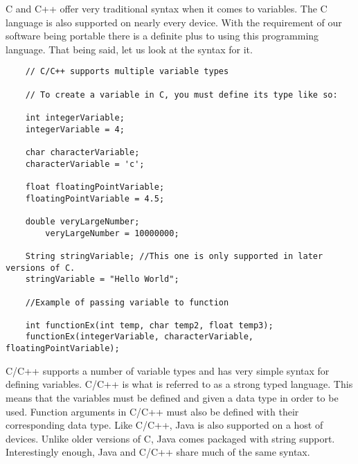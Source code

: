 \documentclass[journal,10pt,onecolumn,compsoc]{IEEEtran} \usepackage[margin=1.0in]{geometry} \usepackage{pdfpages} \usepackage{graphicx}
\begin{document}
\noindent C and C++ offer very traditional syntax when it comes to variables. 
The C language is also supported on nearly every device. 
With the requirement of our software being portable there is a definite plus to using this programming language. 
That being said, let us look at the syntax for it.

\begin{verbatim}
	// C/C++ supports multiple variable types

	// To create a variable in C, you must define its type like so:

	int integerVariable;
	integerVariable = 4;

	char characterVariable;
	characterVariable = 'c';
    
	float floatingPointVariable;
	floatingPointVariable = 4.5;

	double veryLargeNumber;
    	veryLargeNumber = 10000000;

	String stringVariable; //This one is only supported in later versions of C.
	stringVariable = "Hello World";

	//Example of passing variable to function
    
	int functionEx(int temp, char temp2, float temp3);
	functionEx(integerVariable, characterVariable, floatingPointVariable);
\end{verbatim}

\noindent C/C++ supports a number of variable types and has very simple syntax for defining variables. 
C/C++ is what is referred to as a strong typed language.
This means that the variables must be defined and given a data type in order to be used. \cite{cppvar} 
Function arguments in C/C++ must also be defined with their corresponding data type.
Like C/C++, Java is also supported on a host of devices. 
Unlike older versions of C, Java comes packaged with string support.
Interestingly enough, Java and C/C++ share much of the same syntax.
\end{document}
